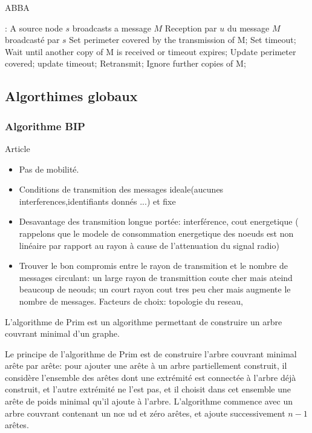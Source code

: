 \begin{algorithm}[h]
\caption{ABBA}
\label{ABBA}
\begin{algorithmic}
\REQUIRE:
A source node $s$ broadcasts a message $M$
\STATE Reception  par  $u$ du message $M$ broadcasté par $s$
\STATE Set perimeter covered by the transmission of M;
\STATE Set timeout;
\REPEAT
    \STATE Wait until another copy of M is received or timeout expires;
	\STATE Update perimeter covered;
	\STATE update timeout;
    \ENDIF
{}
    \STATE Retransmit;
\ENDIF
     \STATE Ignore further copies of M;

\end{algorithmic}
\end{algorithm}




\subsection{Algorthimes globaux}
\subsubsection{Algorithme BIP}
Article \cite{Wieselthier00}
\begin{itemize}
 \item Pas de mobilité.
 \item Conditions de transmition des messages ideale(aucunes interferences,identifiants donnés ...)  et fixe
 \item Desavantage des transmition longue portée: interférence, cout energetique ( rappelons que le modele de consommation energetique des noeuds est non linéaire par rapport au rayon à cause de l'attenuation du signal radio)
 \item Trouver le bon compromis entre le rayon de transmition et le nombre de messages circulant: un large rayon de transmittion coute cher mais ateind beaucoup de neouds; un court rayon cout tres peu cher mais 
augmente le nombre de messages. Facteurs de choix: topologie du reseau,



\end{itemize}

  L'algorithme de Prim est un algorithme permettant de construire un arbre
  couvrant minimal d'un graphe. 

  Le principe de l'algorithme de Prim est de construire l'arbre couvrant
  minimal arête par arête: pour ajouter une arête à un arbre partiellement
  construit, il considère l'ensemble des arêtes dont une extrémité est
  connectée à l'arbre déjà construit, et l'autre extrémité ne l'est pas, et
  il choisit dans cet ensemble une arête de poids minimal qu'il ajoute à
  l'arbre. L'algorithme commence avec un arbre couvrant contenant un n\oe
  ud et zéro arêtes, et ajoute successivement $n-1$ arêtes.

